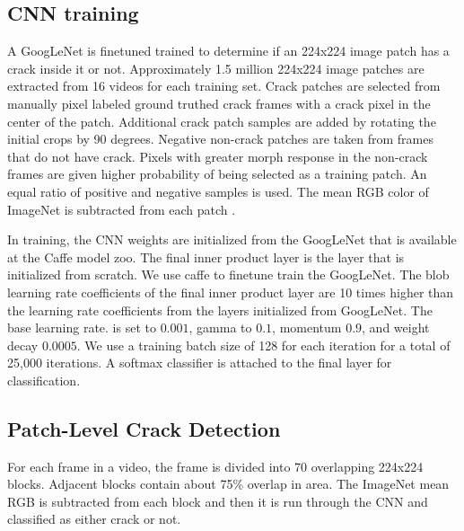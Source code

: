     \subsection{CNN training}
                A GoogLeNet is finetuned trained to determine if an 224x224 image patch has a crack inside it or not. Approximately 1.5 million 224x224 image patches are extracted from 16 videos for each training set. Crack patches are selected from manually pixel labeled ground truthed crack frames with a crack pixel in the center of the patch. Additional crack patch samples are added by rotating the initial crops by 90 degrees.  Negative non-crack patches are taken from frames that do not have crack. Pixels with greater morph response  in the non-crack frames are given higher probability  of being selected as a training patch. An equal ratio of positive and negative samples is used. The mean RGB color of ImageNet is subtracted from each patch .
                
                In training, the CNN weights are initialized from the GoogLeNet that is available at the Caffe model zoo. The final inner product layer is the layer that is initialized from scratch. We use caffe \cite{jia2014} to finetune train the GoogLeNet.  The blob learning rate coefficients of the final inner product layer are 10 times higher than the learning rate coefficients from the layers initialized from GoogLeNet.  The base learning rate. is set to  $0.001$,   gamma to $0.1$, momentum $0.9$, and weight decay $0.0005$.  We use a training batch size of 128 for each iteration for a total of 25,000 iterations.  A softmax classifier is attached to the final layer for classification.
                
                
    \subsection{Patch-Level Crack Detection}
                For each frame in a video, the frame is divided into 70 overlapping 224x224  blocks. Adjacent blocks contain about 75\% overlap in area. The ImageNet mean RGB is subtracted from each block and then it is run through the CNN    and classified as either crack or not.
    
